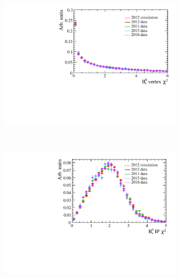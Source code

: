 \begin{figure}
 \begin{subfigure}[b]{0.48\textwidth}
        \includegraphics[width=\textwidth]{./Figs/Selection/bkgnd_vertex.pdf}
        \caption{ }
        \label{fig:BDTsig}
    \end{subfigure}
    ~ %
    \begin{subfigure}[b]{0.48\textwidth}
       \includegraphics[width=\textwidth]{./Figs/Selection/bkgnd_IPS.pdf}
        \caption{ }
        \label{fig:BDTbkg}
    \end{subfigure}






\end{figure}
